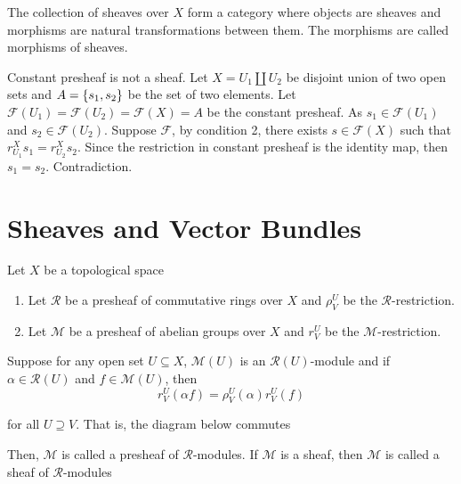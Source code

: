 \begin{definition}
	The collection of sheaves over $X$ form a category where objects are sheaves and morphisms are natural transformations between them. The morphisms are called morphisms of sheaves.
\end{definition}

\begin{remark}
	Constant presheaf is not a sheaf. Let $X = U_1 \coprod U_2$ be disjoint union of two open sets and $A = \{s_1, s_2\}$ be the set of two elements. Let $\mathcal{F}(U_1) = \mathcal{F}(U_2) = \mathcal{F}(X) = A$ be the constant presheaf. As $s_1 \in \mathcal{F}(U_1)$ and $s_2 \in \mathcal{F}(U_2)$. Suppose $\mathcal{F}$, by condition 2, there exists $s \in \mathcal{F}(X)$ such that $r^X_{U_1} s_1 = r^X_{U_2} s_2$. Since the restriction in constant presheaf is the identity map, then $s_1 = s_2$. Contradiction.
	
\end{remark}

\section{Sheaves and Vector Bundles}

\begin{definition}
	Let $X$ be a topological space
	\begin{enumerate}
		\item Let $\mathcal{R}$ be a presheaf of commutative rings over $X$ and $\rho^U_V$ be the $\mathcal{R}$-restriction.
		\item Let $\mathcal{M}$ be a presheaf of abelian groups over $X$ and $r^U_V$ be the $\mathcal{M}$-restriction.
	\end{enumerate}
	
	Suppose for any open set $U \subseteq X$, $\mathcal{M}(U)$ is an $\mathcal{R}(U)$-module and if $\alpha \in \mathcal{R}(U)$ and $f \in \mathcal{M}(U)$, then
	$$
	r^U_V(\alpha f) = \rho^U_V(\alpha) r^U_V(f)
	$$
	
	for all $U \supseteq V$. That is, the diagram below commutes
	\begin{center}
	\end{center}
	
	Then, $\mathcal{M}$ is called a presheaf of $\mathcal{R}$-modules. If $\mathcal{M}$ is a sheaf, then $\mathcal{M}$ is called a sheaf of $\mathcal{R}$-modules
\end{definition}

